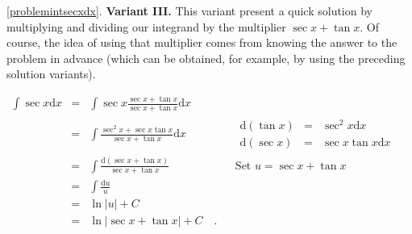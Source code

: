{\ref{problemintsecxdx}. \textbf{Variant III. } This variant present a quick solution by multiplying and dividing our integrand by the multiplier $\sec x+\tan x$. Of course, the idea of using that multiplier comes from knowing the answer to the problem in advance (which can be obtained, for example, by using the preceding solution variants).

$\begin{array}{rcll|l}
\displaystyle \int \sec x \text{d} x&=&\displaystyle \int \sec x \frac{\sec x +\tan x }{\sec x+\tan x }\text{d} x  \\
&=& \displaystyle \int \frac{\sec^2 x+\sec x\tan x }{\sec x +\tan x }\text{d} x&&
\begin{array}{rcl}
\text{d} (\tan x )&=&\sec^2 x\text{d} x\\
\text{d} (\sec x)&=&\sec x\tan x \text{d} x
\end{array}\\
&=&\displaystyle  \int \frac{\text{d} (\sec x+\tan x) }{\sec x +\tan x} &&\text{Set }u=\sec x +\tan x\\
&=&\displaystyle \int \frac{\text{d} u}{u}\\
&=&\displaystyle \ln |u|+C\\
&=&\displaystyle \ln |\sec x +\tan x|+C\quad .
\end{array}
$
}


